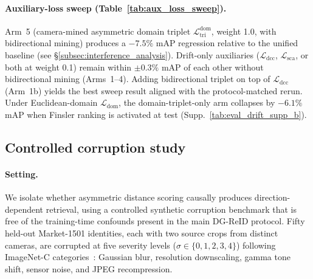 \paragraph{Auxiliary-loss sweep (Table~\ref{tab:aux_loss_sweep}).}
Arm~5 (camera-mined asymmetric domain triplet $\mathcal{L}_{\mathrm{tri}}^{\mathrm{dom}}$, weight 1.0, with bidirectional mining) produces a $-7.5\%$ mAP regression relative to the unified baseline (see \S\ref{subsec:interference_analysis}). Drift-only auxiliaries ($\mathcal{L}_{\mathrm{dcc}}$, $\mathcal{L}_{\mathrm{sca}}$, or both at weight 0.1) remain within $\pm 0.3\%$ mAP of each other without bidirectional mining (Arms~1--4). Adding bidirectional triplet on top of $\mathcal{L}_{\mathrm{dcc}}$ (Arm~1b) yields the best sweep result aligned with the protocol-matched rerun. Under Euclidean-domain $\mathcal{L}_{\mathrm{dom}}$, the domain-triplet-only arm collapses by $-6.1\%$ mAP when Finsler ranking is activated at test (Supp.~\ref{tab:eval_drift_supp_b}).


\subsection{Controlled corruption study} \label{subsec:controlled_corruption}

\paragraph{Setting.}
We isolate whether asymmetric distance scoring causally produces direction-dependent retrieval, using a controlled synthetic corruption benchmark that is free of the training-time confounds present in the main DG-ReID protocol. Fifty held-out Market-1501 identities, each with two source crops from distinct cameras, are corrupted at five severity levels ($\sigma\!\in\!\{0,1,2,3,4\}$) following ImageNet-C categories~\cite{hendrycks2019benchmarking}: Gaussian blur, resolution downscaling, gamma tone shift, sensor noise, and JPEG recompression.

